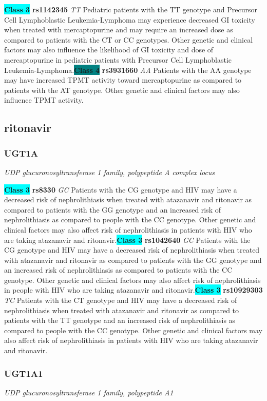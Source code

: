 \documentclass{report}
\begin{document}
\textbf{\colorbox{cyan} {Class 3}} \textbf{ rs1142345 } \textit{ TT }
Pediatric patients with the TT genotype and Precursor Cell Lymphoblastic Leukemia-Lymphoma may experience decreased GI toxicity when treated with mercaptopurine and may require an increased dose as compared to patients with the CT or CC genotypes. Other genetic and clinical factors may also influence the likelihood of GI toxicity and dose of mercaptopurine in pediatric patients with Precursor Cell Lymphoblastic Leukemia-Lymphoma.\newline\textbf{\colorbox{teal} {Class 4}} \textbf{ rs3931660 } \textit{ AA }
Patients with the AA genotype may have increased TPMT activity toward mercaptopurine as compared to patients with the AT genotype. Other genetic and clinical factors may also influence TPMT activity. \newline\subsection{ ritonavir }\subsubsection{ UGT1A }
\textit{ UDP glucuronosyltransferase 1 family, polypeptide A complex locus }

\textbf{\colorbox{cyan} {Class 3}} \textbf{ rs8330 } \textit{ GC }
Patients with the CG genotype and HIV may have a decreased risk of nephrolithiasis when treated with atazanavir and ritonavir as compared to patients with the GG genotype and an increased risk of nephrolithiasis as compared to people with the CC genotype. Other genetic and clinical factors may also affect risk of nephrolithiasis in patients with HIV who are taking atazanavir and ritonavir.\newline\textbf{\colorbox{cyan} {Class 3}} \textbf{ rs1042640 } \textit{ GC }
Patients with the CG genotype and HIV may have a decreased risk of nephrolithiasis when treated with atazanavir and ritonavir as compared to patients with the GG genotype and an increased risk of nephrolithiasis as compared to patients with the CC genotype. Other genetic and clinical factors may also affect risk of nephrolithiasis in people with HIV who are taking atazanavir and ritonavir.\newline\textbf{\colorbox{cyan} {Class 3}} \textbf{ rs10929303 } \textit{ TC }
Patients with the CT genotype and HIV may have a decreased risk of nephrolithiasis when treated with atazanavir and ritonavir as compared to patients with the TT genotype and an increased risk of nephrolithiasis as compared to people with the CC genotype. Other genetic and clinical factors may also affect risk of nephrolithiasis in patients with HIV who are taking atazanavir and ritonavir. \newline\subsubsection{ UGT1A1 }
\textit{ UDP glucuronosyltransferase 1 family, polypeptide A1 }
\end{document}
